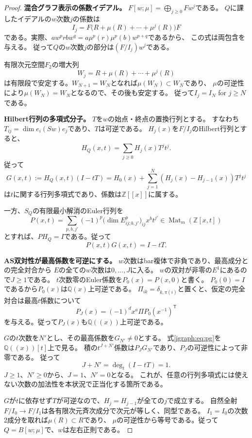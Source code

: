 \documentclass[11pt,a4paper]{ltjsarticle}
\theoremstyle{definition}
\begin{document}
\begin{proof}
\par\smallskip\noindent\textbf{混合グラフ表示の係数イデアル。}\quad
$F[w;\mu]=\bigoplus_{j\ge0}Fw^j$である。
$Q$に課したイデアルの$w$次数$j$の係数は
\[
I_j=F\bigl(R+\mu(R)+\cdots+\mu^j(R)\bigr)F
\]
である。実際、$a w^p r b w^q=a\mu^p(r)\mu^p(b)w^{p+q}$であるから、
この式は両包含を与える。
従って$Q$の$w$次数$j$の部分は$(F/I_j)w^j$である。

有限次元空間$F_2$の増大列
\[
W_j=R+\mu(R)+\cdots+\mu^j(R)
\]
は有限段で安定する。$W_{N+1}=W_N$となれば$\mu(W_N)\subset W_N$であり、
$\mu$の可逆性により$\mu(W_N)=W_N$となるので、その後も安定する。
従って$I_j=I_N$ for $j\ge N$である。

\par\smallskip\noindent\textbf{Hilbert行列の多項式分子。}\quad
$T$を$w$の始点・終点の置換行列とする。
すなわち$T_{ij}=\dim e_i(Sw)e_j$であり、$T$は可逆である。
$H_j(x)$を$F/I_j$のHilbert行列とすると、
\[
H_Q(x,t)=\sum_{j\ge0}H_j(x)T^j t^j.
\]
従って
\[
G(x,t):=H_Q(x,t)(I-tT)
=H_0(x)+\sum_{j=1}^{N}(H_j(x)-H_{j-1}(x))T^j t^j
\]
は$t$に関する行列多項式であり、係数は$\mathbb Z[[x]]$に属する。

一方、$S_Q$の有限最小解消のEuler行列を
\[
P(x,t)=\sum_{p,b,j'}(-1)^p
\bigl(\dim E^p_{ij;b,j'}\bigr)_{ij}x^b t^{j'}
\in\operatorname{Mat}_m(\mathbb Z[x,t])
\]
とすれば、$P H_Q=I$である。従って
\begin{equation}\label{igraph:eq:pg}
P(x,t)G(x,t)=I-tT.
\end{equation}

\par\smallskip\noindent\textbf{AS双対性が最高係数を可逆にする。}\quad
$w$次数はbar複体で非負であり、最高成分との完全対合から
$E$の全ての$w$次数は$0,\ldots,J$に入る。
$w$の双対が非零の$E^1$にあるので$J\ge1$である。
$t$次数零のEuler係数を$P_0(x)=P(x,0)$と書く。
$P_0(0)=I$であるから$P_0(x)$は$\mathbb Q(x)$上可逆である。
$\Pi_{ik}=\delta_{k,\pi(i)}$と置くと、仮定の完全対合は最高$t$係数について
\begin{equation}\label{igraph:eq:leading-duality}
P_J(x)=(-1)^d x^a\Pi P_0(x^{-1})^{\mathsf T}
\end{equation}
を与える。従って$P_J(x)$も$\mathbb Q((x))$上可逆である。

$G$の$t$次数を$N'$とし、その最高係数を$G_{N'}\ne0$とする。
式\eqref{igraph:eq:pg}を$\mathbb Q((x))[t]$上で見る。
積の$t^{J+N'}$係数は$P_JG_{N'}$であり、$P_J$の可逆性によって非零である。
従って
\[
J+N'=\deg_t(I-tT)=1.
\]
$J\ge1$、$N'\ge0$から、$J=1$、$N'=0$となる。
これが、任意の行列多項式には使えない次数の加法性を本状況で正当化する箇所である。

$G$が$t$に依存せず$T$が可逆なので、$H_j=H_{j-1}$が全ての$j$で成立する。
自然全射$F/I_0\to F/I_1$は各有限次元斉次成分で次元が等しく、同型である。
$I_1=I_0$の次数2成分を取れば$\mu(R)\subset R$であり、
$\mu$の可逆性から等号である。従って$Q=B[w;\mu]$で、$w$は左右正則である。

\end{proof}
\end{document}
